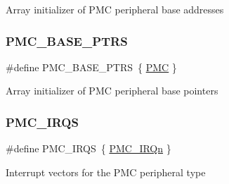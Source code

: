 Array initializer of P\+MC peripheral base addresses \mbox{\label{group___p_m_c___peripheral___access___layer_ga4bcd62643d597f7230f9c1e3d03caaa7}} 
\subsubsection{\texorpdfstring{PMC\_BASE\_PTRS}{PMC\_BASE\_PTRS}}
{\footnotesize\ttfamily \#define P\+M\+C\+\_\+\+B\+A\+S\+E\+\_\+\+P\+T\+RS~\{ \mbox{\hyperlink{group___p_m_c___peripheral___access___layer_ga979c6d379c67bc2f3e8eb6efcb509f69}{P\+MC}} \}}

Array initializer of P\+MC peripheral base pointers \mbox{\label{group___p_m_c___peripheral___access___layer_ga55eb026c8e8941e1e4d009d8563784b0}} 
\subsubsection{\texorpdfstring{PMC\_IRQS}{PMC\_IRQS}}
{\footnotesize\ttfamily \#define P\+M\+C\+\_\+\+I\+R\+QS~\{ \mbox{\hyperlink{group___interrupt__vector__numbers_gga666eb0caeb12ec0e281415592ae89083a713239de483bf25c3b2134414be9faa0}{P\+M\+C\+\_\+\+I\+R\+Qn}} \}}

Interrupt vectors for the P\+MC peripheral type 